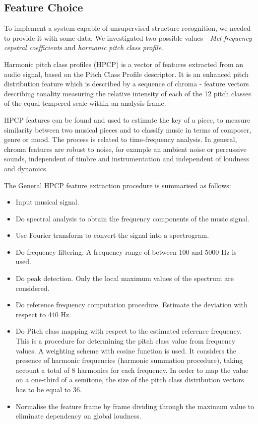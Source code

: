 \subsection{Feature Choice}

To implement a system capable of unsupervised structure recognition, we needed to provide it with some data. We investigated two possible values - \textit{Mel-frequency cepstral coefficients} and \textit{harmonic pitch class profile}.

Harmonic pitch class profiles (HPCP) is a vector of features extracted from an audio signal, based on the Pitch Class Profile descriptor. It is an enhanced pitch distribution feature which is described by a sequence of chroma - feature vectors describing tonality measuring the relative intensity of each of the 12 pitch classes of the equal-tempered scale within an analysis frame. 

HPCP features can be found and used to estimate the key of a piece, to measure similarity between two musical pieces and to classify music in terms of composer, genre or mood. The process is related to time-frequency analysis. In general, chroma features are robust to noise, for example an ambient noise or percussive sounds, independent of timbre and instrumentation and independent of loudness and dynamics.

The General HPCP feature extraction procedure is summarised as follows:
\begin{itemize}
\item Input musical signal.
\item Do spectral analysis to obtain the frequency components of the music signal.
\item Use Fourier transform to convert the signal into a spectrogram.
\item Do frequency filtering. A frequency range of between 100 and 5000 Hz is used.
\item Do peak detection. Only the local maximum values of the spectrum are considered.
\item Do reference frequency computation procedure. Estimate the deviation with respect to 440 Hz.
\item Do Pitch class mapping with respect to the estimated reference frequency. This is a procedure for determining the pitch class value from frequency values. A weighting scheme with cosine function is used. It considers the presence of harmonic frequencies (harmonic summation procedure), taking account a total of 8 harmonics for each frequency. In order to map the value on a one-third of a semitone, the size of the pitch class distribution vectors has to be equal to 36.
\item Normalise the feature frame by frame dividing through the maximum value to eliminate dependency on global loudness.
\end{itemize}

